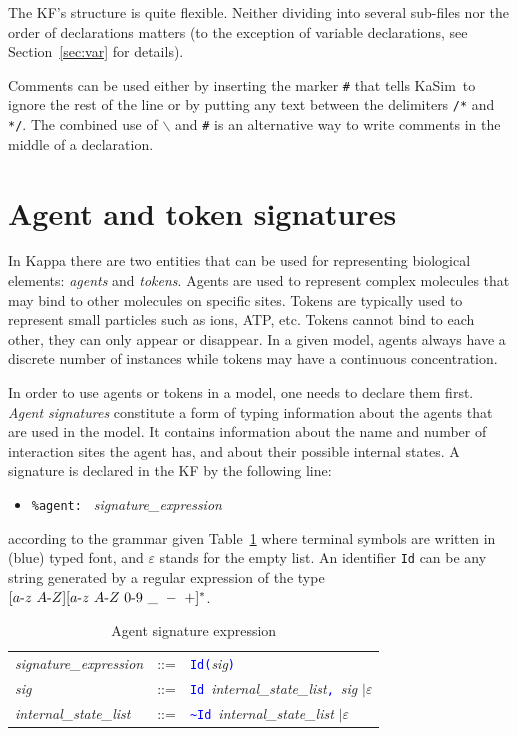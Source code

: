 \documentclass[11pt]{book}
\def\KaSim{\textsf{KaSim}}
\def\sep{\hbox{-}}
\def\intstate{\textasciitilde}
\def\tcb#1{\textcolor{blue}{\ttt{#1}}}
\def\ttt#1{\texttt{#1}}
\def\bs{\backslash}
\def\ITE#1{\begin{itemize}#1\end{itemize}}
\def\imp#1{\emph{#1}\index{#1}}
\begin{document}
The KF's structure is quite flexible. Neither
dividing into several sub-files nor the order of
declarations matters (to the exception of variable
declarations, see Section~\ref{sec:var} for
details).

Comments can be used either by inserting the marker
\ttt{\#} that tells \KaSim~to ignore the rest of the line or by
putting any text between the delimiters \ttt{/*} and \ttt{*/}. The
combined use of \ttt{$\bs$} and \ttt{\#} is an alternative way to
write comments in the middle of a declaration.

\section{Agent and token signatures}\label{sec:sig}
%
In Kappa there are two entities that can be used for representing
biological elements: \imp{agents} and \imp{tokens}.  Agents are used
to represent complex molecules that may bind to other molecules on
specific sites. Tokens are typically used to represent small particles
such as ions, ATP, etc. Tokens cannot bind to each other, they can
only appear or disappear. In a given model, agents always have a
discrete number of instances while tokens may have a continuous
concentration.

In order to use agents or tokens in a model, one needs to declare them
first. \emph{Agent signatures} constitute a
form of typing information about the agents that are used in the
model. It contains information about the name and number of
interaction sites the agent has, and about their possible internal
states. A signature is declared in the
KF by the following line: \ITE{
\item[] \ttt{\%agent: } \textit{signature\_expression} } according to
the grammar given Table~\ref{tab:sig} where terminal symbols are
written in (blue) typed font, and $\varepsilon$ stands for the empty
list. An identifier \ttt{Id} can be any string generated by a regular
expression of the type $[a\sep z\ A\sep Z][a\sep z\ A \sep Z\ 0\sep
  9\ \_ \ -\ +]^*$.
\begin{table}[htbp]
  \centering
  \caption{Agent signature%
 expression}
  \begin{tabular}{@{} lcl @{}}
    \textit{signature\_expression} & ::= &
    \tcb{Id}\tcb{(}\textit{sig}\tcb{)} \\

    \textit{sig} & ::= &
    \tcb{Id}~\textit{internal\_state\_list}\tcb{,}\ \textit{sig}
    $\mid\varepsilon$ \\

    \textit{internal\_state\_list} & ::= &
    \tcb{\intstate{}Id}~\textit{internal\_state\_list}
    $\mid\varepsilon$
    \end{tabular}
  \label{tab:sig}
\end{table}
\end{document}
